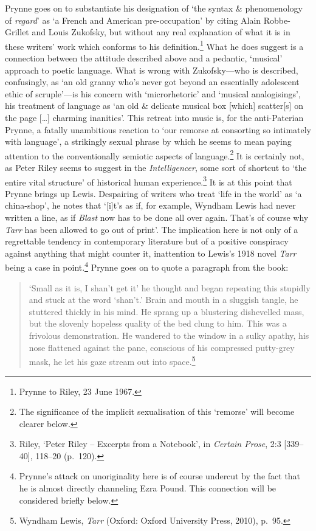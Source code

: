 \documentclass[]{article}
\begin{document}
Prynne goes on to substantiate his designation of ‘the syntax \&
phenomenology of \emph{regard}’ as ‘a French and American
pre-occupation’ by citing Alain Robbe-Grillet and Louis Zukofsky, but
without any real explanation of what it is in these writers’ work which
conforms to his definition.\footnote{Prynne to Riley, 23 June 1967.}
What he does suggest is a connection between the attitude described
above and a pedantic, ‘musical’ approach to poetic language. What is
wrong with Zukofsky—who is described, confusingly, as ‘an old granny
who’s never got beyond an essentially adolescent ethic of scruple’—is
his concern with ‘microrhetoric’ and ‘musical analogisings’, his
treatment of language as ‘an old \& delicate musical box {[}which{]}
scatter{[}s{]} on the page {[}\ldots{}{]} charming inanities’. This
retreat into music is, for the anti-Paterian Prynne, a fatally
unambitious reaction to ‘our remorse at consorting so intimately with
language’, a strikingly sexual phrase by which he seems to mean paying
attention to the conventionally semiotic aspects of language.\footnote{The
  significance of the implicit sexualisation of this ‘remorse’ will
  become clearer below.} It is certainly not, as Peter Riley seems to
suggest in the \emph{Intelligencer}, some sort of shortcut to ‘the
entire vital structure’ of historical human experience.\footnote{Riley,
  ‘Peter Riley – Excerpts from a Notebook’, in \emph{Certain Prose}, 2:3
  {[}339–40{]}, 118–20 (p.~120).} It is at this point that Prynne brings
up Lewis. Despairing of writers who treat ‘life in the world’ as ‘a
china-shop’, he notes that ‘{[}i{]}t’s as if, for example, Wyndham Lewis
had never written a line, as if \emph{Blast} now has to be done all over
again. That’s of course why \emph{Tarr} has been allowed to go out of
print’. The implication here is not only of a regrettable tendency in
contemporary literature but of a positive conspiracy against anything
that might counter it, inattention to Lewis’s 1918 novel \emph{Tarr}
being a case in point.\footnote{Prynne’s attack on unoriginality here is
  of course undercut by the fact that he is almost directly channeling
  Ezra Pound. This connection will be considered briefly below.} Prynne
goes on to quote a paragraph from the book:

\begin{quote}
\singlespacing ‘Small as it is, I shan’t get it’ he thought and began
repeating this stupidly and stuck at the word ‘shan’t.’ Brain and mouth
in a sluggish tangle, he stuttered thickly in his mind. He sprang up a
blustering dishevelled mass, but the slovenly hopeless quality of the
bed clung to him. This was a frivolous demonstration. He wandered to the
window in a sulky apathy, his nose flattened against the pane, conscious
of his compressed putty-grey mask, he let his gaze stream out into
space.\footnote{Wyndham Lewis, \emph{Tarr} (Oxford: Oxford University
  Press, 2010), p.~95.}
\end{quote}
\end{document}
